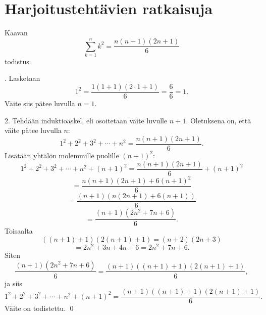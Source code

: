 \chapter{Harjoitustehtävien ratkaisuja}

Kaavan 
\[
\sum_{k=1}^n k^2= \frac{n(n+1)(2n+1)}{6}
\]
todistus.

. Lasketaan
\[
1^2 = \frac{1(1+1)(2\cdot 1 +1)}{6} = \frac{6}{6}=1.
\]
Väite siis pätee luvulla $n=1$.

2. Tehdään induktioaskel, eli osoitetaan väite luvulle $n+1$. Oletuksena on, että väite pätee luvulla $n$:
\[
1^2+2^2+3^2 + \cdots + n^2 = \frac{n(n+1)(2n+1)}{6}.
\]
Lisätään yhtälön molemmille puolille $(n+1)^2$:
\[
1^2+2^2+3^2 + \cdots + n^2+ (n+1)^2 = \frac{n(n+1)(2n+1)}{6}+(n+1)^2
\]
\[
= \frac{n(n+1)(2n+1)+6(n+1)^2}{6}
\]
\[
= 
\frac{(n+1)(n(2n+1)+6(n+1))}{6}
\]
\[
=
\frac{(n+1)(2n^2+7n+6)}{6}.
\]
Toisaalta
\[
((n+1)+1)(2(n+1)+1)=(n+2)(2n+3)
\]
\[
=2n^2+3n+4n+6=2n^2+7n+6.
\]
Siten 
\[
\frac{(n+1)(2n^2+7n+6)}{6}
= \frac{(n+1)((n+1)+1)(2(n+1)+1)}{6},
\]
ja siis
\[
1^2+2^2+3^2 + \cdots + n^2+ (n+1)^2 %
= \frac{(n+1)((n+1)+1)(2(n+1)+1)}{6}.
\]
Väite on todistettu.
\qed
